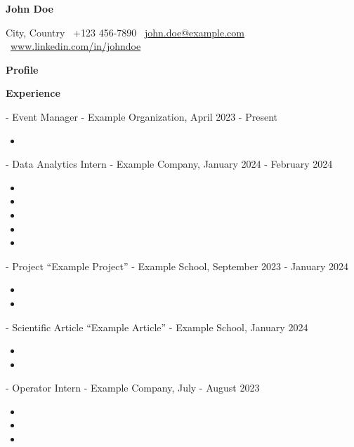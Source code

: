 \documentclass[11pt]{article}
\newcommand{\sectiontitle}[1]{\noindent\textbf{\large #1}}
\newcommand{\subsectiontitle}[1]{\noindent\textbf{#1}}
\newcommand{\name}[1]{\textcolor{blue!80!black}{\textbf{\large #1}}}
\newcommand{\email}[1]{\href{mailto:{#1}}{#1}}
\newcommand{\website}[1]{\href{#1}{#1}}
\begin{document}
\begin{center}
    \name{John Doe}
    \hrulefill
\end{center}

\begin{center}
    City, Country \textbullet \ +123 456-7890 \textbullet \ \email{john.doe@example.com} \textbullet \ \website{www.linkedin.com/in/johndoe}
\end{center}

\vspace{0.5pt}

\sectiontitle{Profile}

\lipsum[1]

\begin{multicols}{2}

\subsectiontitle{Experience}

- Event Manager - Example Organization, April 2023 - Present
\begin{itemize}[topsep=0pt, partopsep=0pt, parsep=0pt, leftmargin=1.2cm]
    \item \lipsum[2]
\end{itemize}

- Data Analytics Intern - Example Company, January 2024 - February 2024
\begin{itemize}[topsep=0pt, partopsep=0pt, parsep=0pt, leftmargin=1.2cm]
    \item \lipsum[3]
    \item \lipsum[4]
    \item \lipsum[5]
    \item \lipsum[6]
    \item \lipsum[7]
\end{itemize}

- Project “Example Project” - Example School, September 2023 - January 2024
\begin{itemize}[topsep=0pt, partopsep=0pt, parsep=0pt, leftmargin=1.2cm]
    \item \lipsum[8]
    \item \lipsum[9]
\end{itemize}

- Scientific Article “Example Article” - Example School, January 2024
\begin{itemize}[topsep=0pt, partopsep=0pt, parsep=0pt, leftmargin=1.2cm]
    \item \lipsum[10]
    \item \lipsum[11]
\end{itemize}

- Operator Intern - Example Company, July - August 2023
\begin{itemize}[topsep=0pt, partopsep=0pt, parsep=0pt, leftmargin=1.2cm]
    \item \lipsum[12]
    \item \lipsum[13]
    \item \lipsum[14]
\end{itemize}


\end{multicols}
\end{document}
